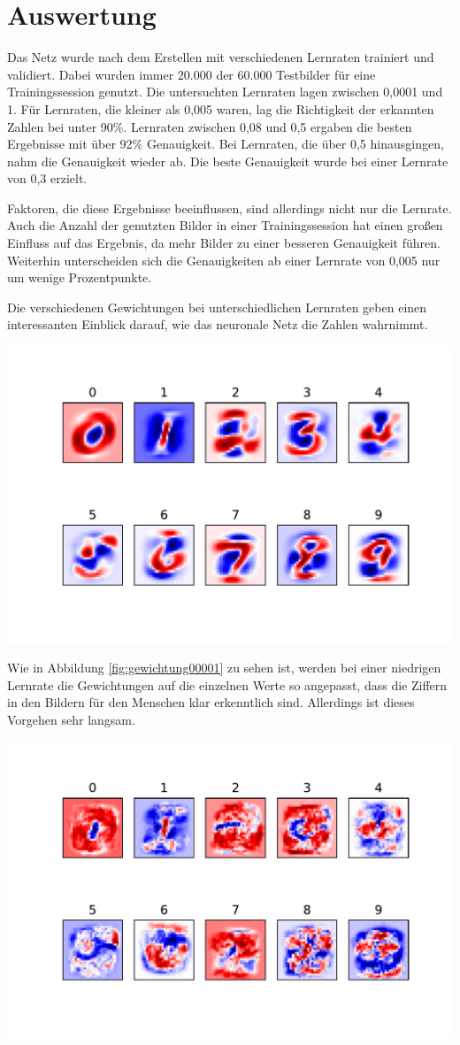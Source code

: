 \section{Auswertung}
\label{sec:auswertung}
\printsubchapterauthor{\authorMarco}
Das Netz wurde nach dem Erstellen mit verschiedenen Lernraten trainiert und validiert. Dabei wurden immer 20.000 der 60.000 Testbilder für eine Trainingssession genutzt. Die untersuchten Lernraten lagen zwischen 0,0001 und 1. Für Lernraten, die kleiner als 0,005 waren, lag die Richtigkeit der erkannten Zahlen bei unter 90\%. Lernraten zwischen 0,08 und 0,5 ergaben die besten Ergebnisse mit über 92\% Genauigkeit. Bei Lernraten, die über 0,5 hinausgingen, nahm die Genauigkeit wieder ab. Die beste Genauigkeit wurde bei einer Lernrate von 0,3 erzielt.

Faktoren, die diese Ergebnisse beeinflussen, sind allerdings nicht nur die Lernrate. Auch die Anzahl der genutzten Bilder in einer Trainingssession hat einen großen Einfluss auf das Ergebnis, da mehr Bilder zu einer besseren Genauigkeit führen. Weiterhin unterscheiden sich die Genauigkeiten ab einer Lernrate von 0,005 nur um wenige Prozentpunkte.

Die verschiedenen Gewichtungen bei unterschiedlichen Lernraten geben einen interessanten Einblick darauf, wie das neuronale Netz die Zahlen wahrnimmt.
\begin{center}
	\includegraphics[width=.6\textwidth]{../abbildungen/weightPlot00001.pdf}
	\label{fig:gewichtung00001}
\end{center}

Wie in Abbildung \ref{fig:gewichtung00001} zu sehen ist, werden bei einer niedrigen Lernrate die Gewichtungen auf die einzelnen Werte so angepasst, dass die Ziffern in den Bildern für den Menschen klar erkenntlich sind. Allerdings ist dieses Vorgehen sehr langsam.

\begin{center}
	\includegraphics[width=.6\textwidth]{../abbildungen/weightPlot0008.pdf}
	\label{fig:gewichtung0008}
\end{center}

